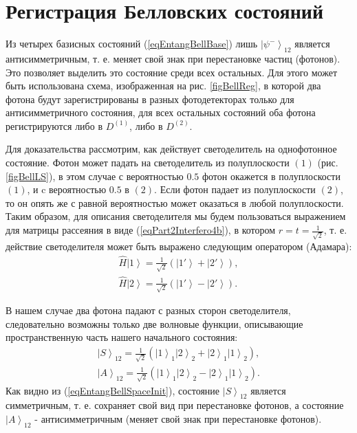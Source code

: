 \section{Регистрация Белловских состояний}
\label{pPart3EntangleBellReg}
Из четырех базисных состояний (\ref{eqEntangBellBase}) лишь 
$\left|\psi^{-}\right>_{12}$ является антисимметричным, т. е. меняет
свой знак при перестановке частиц (фотонов). Это позволяет выделить
это состояние среди всех остальных. Для этого может быть использована
схема, изображенная на рис. \ref{figBellReg}, в которой два фотона
будут зарегистрированы в разных фотодетекторах только для
антисимметричного состояния, для всех остальных состояний оба фотона
регистрируются либо в $D^{(1)}$, либо в $D^{(2)}$.


 
Для доказательства рассмотрим, как действует светоделитель на однофотонное
состояние. Фотон может падать на светоделитель из полуплоскости
$\left(1\right)$ (рис. \ref{figBellLS}), в этом случае с вероятностью
$0.5$ фотон окажется в полуплоскости $\left(1\right)$, и c вероятностью
$0.5$ в $\left(2\right)$. Если фотон падает из полуплоскости
$\left(2\right)$, то он опять же с равной вероятностью может оказаться
в любой полуплоскости. 
Таким образом, для описания светоделителя мы будем пользоваться выражением
для матрицы рассеяния в виде (\ref{eqPart2Interfero4b}), в котором
$r=t=\frac{1}{\sqrt{2}}$, т. е. действие светоделителя может быть
выражено следующим оператором (Адамара\cite{bPhisQuantInfo}):
\begin{eqnarray}
\hat{H} \left|1\right> = \frac{1}{\sqrt{2}}
\left(\left|1'\right> +
\left|2'\right>\right),
\nonumber \\
\hat{H} \left|2\right> = \frac{1}{\sqrt{2}}\left(\left|1'\right> -
\left|2'\right>\right).
\label{eqEntangBellHadamar}
\end{eqnarray}

В нашем случае два фотона падают с разных сторон светоделителя,
следовательно возможны только две волновые функции, описывающие
пространственную часть нашего начального состояния:
\begin{eqnarray}
\left|S\right>_{12} = \frac{1}{\sqrt{2}}\left(
\left|1\right>_1\left|2\right>_2 +
\left|2\right>_1\left|1\right>_2\right),
\nonumber \\
\left|A\right>_{12} = \frac{1}{\sqrt{2}}\left(
\left|1\right>_1\left|2\right>_2 -
\left|2\right>_1\left|1\right>_2\right).
\label{eqEntangBellSpaceInit}
\end{eqnarray}
Как видно из (\ref{eqEntangBellSpaceInit}), состояние $\left|S\right>_{12}$
является симметричным, т. е. сохраняет свой вид при перестановке
фотонов, а состояние $\left|A\right>_{12}$ - антисимметричным (меняет свой
знак при перестановке фотонов).

